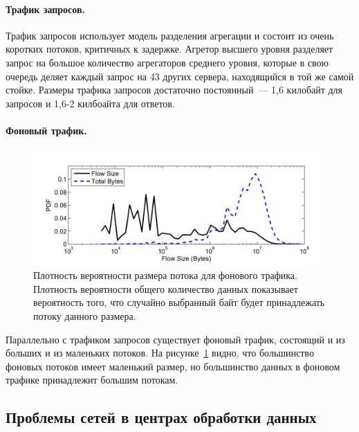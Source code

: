 \documentclass[14pt, a4paper,oneside]{extarticle}
\begin{document}
\paragraph{Трафик запросов.}
Трафик запросов использует модель разделения агрегации и состоит из очень коротких потоков, критичных к задержке. Агретор высшего уровня разделяет запрос на большое количество агрегаторов среднего уровня, которые в свою очередь деляет каждый запрос на 43 других сервера, находящийся в той же самой стойке. Размеры трафика запросов достаточно постоянный~--- 1,6 килобайт для запросов и 1,6-2 килбоайта для ответов.

\paragraph{Фоновый трафик.}
\begin{figure}
\includegraphics[width=\linewidth]{pdf_of_flow_size.png}
\caption{Плотность вероятности размера потока для фонового трафика. Плотность вероятности общего количество данных показывает вероятность того, что случайно выбранный байт будет принадлежать потоку данного размера.}
\label{pdf_of_flow_size}
\end{figure}

Параллельно с трафиком запросов существует фоновый трафик, состоящий и из больших и из маленьких потоков. %
На рисунке~\ref{pdf_of_flow_size} видно, что большинство фоновых потоков имеет маленький размер, но большинство данных в фоновом трафике принадлежит большим потокам.

\subsection{Проблемы сетей в центрах обработки данных}
\end{document}
